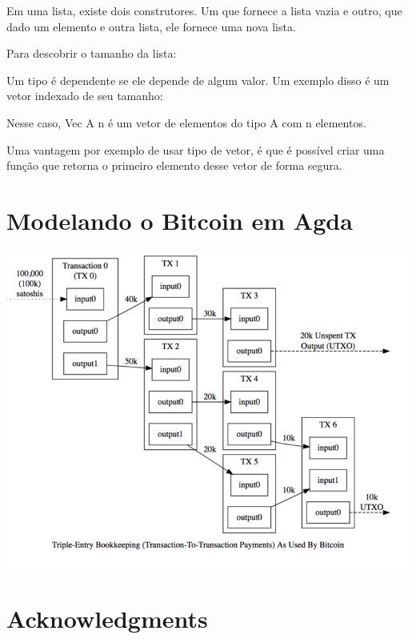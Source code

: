 \documentclass[12pt]{report}
\begin{document}

Em uma lista, existe dois construtores. Um que fornece a lista vazia e outro, que dado um elemento e outra lista, ele fornece uma nova lista.


Para descobrir o tamanho da lista:


Um tipo é dependente se ele depende de algum valor. Um exemplo disso é um vetor indexado de seu tamanho:


Nesse caso, Vec A n é um vetor de elementos do tipo A com n elementos.

Uma vantagem por exemplo de usar tipo de vetor, é que é possível criar uma função que retorna o primeiro elemento desse vetor de forma segura.


\section{Modelando o Bitcoin em Agda}

\includegraphics[scale = 0.5]{utxo}

\newpage
\section{Acknowledgments}
\end{document}
